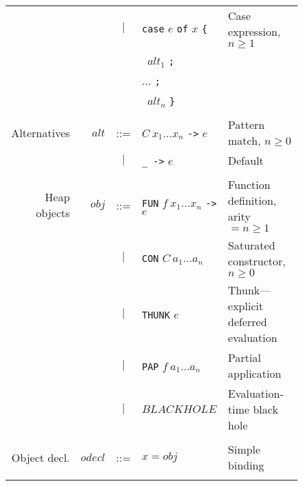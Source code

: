 \documentclass{llncs}
\begin{document}
\begin{figure}
\begin{tabular}{r r c l l}
             &                & $|$ & \texttt{case} $e$ \texttt{of} $x$ \texttt{\{}  & Case expression, $n \ge 1$\\
             &                &     & \texttt{ } $\mathit{alt}_1$ \texttt{;} \\
             &                &     & \hspace{0.2in} $\dots$ \texttt{;} \\
             &                &     & \texttt{ } $\mathit{alt}_n$ \texttt{\}} \\
\\
Alternatives & $\mathit{alt}$ & ::= & $C\ x_1\dots x_n$ \texttt{->} $e$            & Pattern match, $n \ge 0$ \\
             &                & $|$ & \texttt{\_ ->} $e$                           & Default \\
\\
Heap objects & $\mathit{obj}$ & ::= &\texttt{FUN} $f\ x_1\dots x_n$ \texttt{->} $e$   & Function definition, arity $=n\ge 1$ \\
             &                & $|$ &\texttt{CON} $C\ a_1\dots a_n$                & Saturated constructor, $n \ge 0$ \\
             &                & $|$ &\texttt{THUNK} $e$                            & Thunk---explicit deferred evaluation \\
             &                & $|$ &\texttt{PAP} $f\ a_1\dots a_n$               & Partial application \\
             &                & $|$ & $\mathit{BLACKHOLE}$                         & Evaluation-time black hole \\
\\
Object decl. & $\mathit{odecl}$ & ::=  & $x = \mathit{obj}$                           & Simple binding \\
\\

\end{tabular}
\end{figure}
\end{document}
